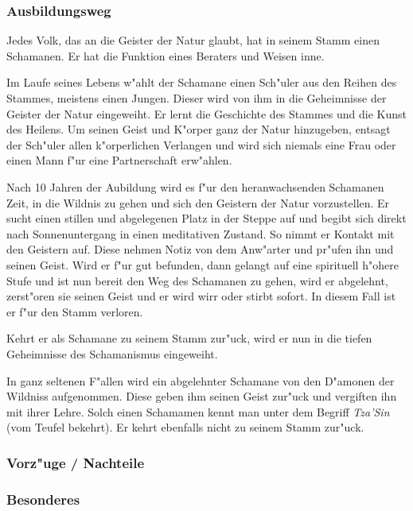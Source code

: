 \subsubsection{Ausbildungsweg}
\par Jedes Volk, das an die Geister der Natur glaubt, hat in seinem Stamm einen Schamanen. 
Er hat die Funktion eines Beraters und Weisen inne.
\par Im Laufe seines Lebens w"ahlt der Schamane einen Sch"uler aus den Reihen des Stammes, 
meistens einen Jungen. Dieser wird von ihm in die Geheimnisse der Geister der 
Natur eingeweiht. Er lernt die Geschichte 
des Stammes und die Kunst des Heilens. Um seinen Geist und K"orper ganz der Natur hinzugeben, 
entsagt der Sch"uler allen k"orperlichen Verlangen und wird sich niemals eine Frau oder einen 
Mann f"ur eine Partnerschaft erw"ahlen. \par Nach 10 Jahren der Aubildung wird es f"ur den 
heranwachsenden Schamanen Zeit, in die Wildnis zu gehen und sich den Geistern der Natur 
vorzustellen. Er sucht einen stillen und abgelegenen Platz in der Steppe auf und begibt 
sich direkt nach Sonnenuntergang in einen meditativen Zustand. So nimmt er Kontakt mit den 
Geistern auf. Diese nehmen Notiz von dem Anw"arter und pr"ufen ihn und seinen Geist. Wird 
er f"ur gut befunden, dann gelangt auf eine spirituell h"ohere Stufe und ist nun bereit den 
Weg des Schamanen zu gehen, wird er abgelehnt, zerst"oren sie seinen Geist und er wird wirr 
oder stirbt sofort. In diesem Fall ist er f"ur den Stamm verloren.
\par Kehrt er als Schamane zu seinem Stamm zur"uck, wird er nun in die tiefen Geheimnisse des 
Schamanismus eingeweiht.
\par In ganz seltenen F"allen wird ein abgelehnter Schamane von den D"amonen 
der Wildniss aufgenommen. Diese geben ihm seinen Geist zur"uck und vergiften ihn mit ihrer Lehre. 
Solch einen Schamamen kennt man unter dem Begriff \textit{Tza'Sin} 
(vom Teufel bekehrt). Er kehrt ebenfalls nicht zu seinem Stamm zur"uck.
\subsubsection{Vorz"uge / Nachteile}
\subsubsection{Besonderes}
